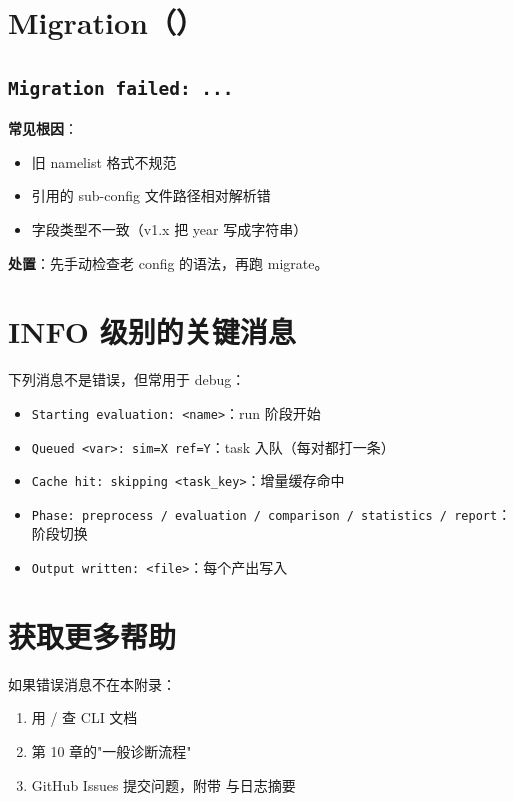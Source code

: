 \section{Migration（）}

\subsection{\texttt{Migration failed: ...}}

\textbf{常见根因}：

\begin{itemize}
  \item 旧 namelist 格式不规范
  \item 引用的 sub-config 文件路径相对解析错
  \item 字段类型不一致（v1.x 把 year 写成字符串）
\end{itemize}

\textbf{处置}：先手动检查老 config 的语法，再跑 migrate。

\section{INFO 级别的关键消息}

下列消息不是错误，但常用于 debug：

\begin{itemize}
  \item \texttt{Starting evaluation: <name>}：run 阶段开始
  \item \texttt{Queued <var>: sim=X ref=Y}：task 入队（每对都打一条）
  \item \texttt{Cache hit: skipping <task\_key>}：增量缓存命中
  \item \texttt{Phase: preprocess / evaluation / comparison / statistics / report}：阶段切换
  \item \texttt{Output written: <file>}：每个产出写入
\end{itemize}

\section{获取更多帮助}

如果错误消息不在本附录：

\begin{enumerate}
  \item 用  /  查 CLI 文档
  \item 第 10 章的"一般诊断流程"
  \item GitHub Issues 提交问题，附带  与日志摘要
\end{enumerate}
